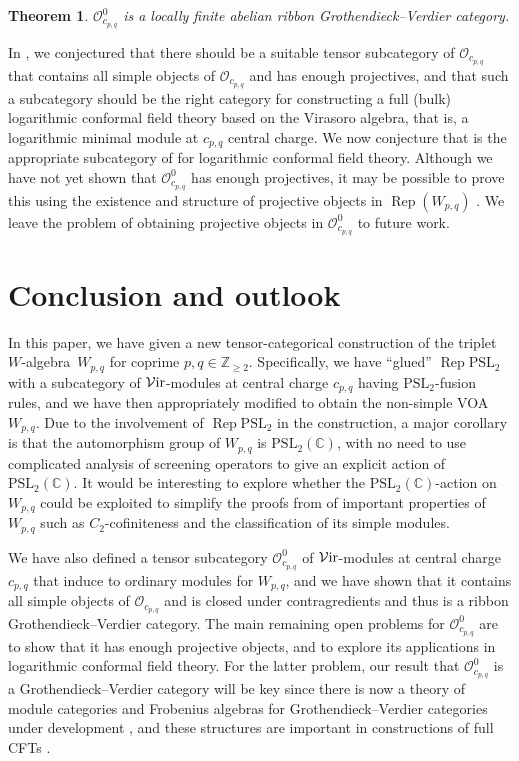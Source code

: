 \documentclass[pdftex]{sigma}
\numberwithin{equation}{section}
\newtheorem{Theorem}{Theorem}[section]
\theoremstyle{definition}
\begin{document}
\begin{Theorem}
$\mathcal{O}_{c_{p,q}}^0$ is a locally finite abelian ribbon Grothendieck--Verdier category.
\end{Theorem}

In \cite[Section 7]{MS-cpq-Vir}, we conjectured that there should be a suitable tensor subcategory of $\mathcal{O}_{c_{p,q}}$ that contains all simple objects of $\mathcal{O}_{c_{p,q}}$ and has enough projectives, and that such a subcategory should be the right category for constructing a full (bulk) logarithmic conformal field theory based on the Virasoro algebra, that is, a logarithmic minimal module at $c_{p,q}$ central charge. We now conjecture that  is the appropriate subcategory of  for logarithmic conformal field theory. Although we have not yet shown that $\mathcal{O}_{c_{p,q}}^0$ has enough projectives, it may be possible to prove this using the existence and structure of projective objects in $\operatorname{Rep}(W_{p,q})$ \cite{Nak-Wpq-projective}. We leave the problem of obtaining projective objects in $\mathcal{O}_{c_{p,q}}^0$ to future work.

\section{Conclusion and outlook}

In this paper, we have given a new tensor-categorical construction of the triplet $W$-algebra~$W_{p,q}$ for coprime $p,q\in\mathbb{Z}_{\geq 2}$. Specifically, we have ``glued'' $\operatorname{Rep} \mathrm{PSL}_2$ with a subcategory of $\mathcal{V}{\rm ir}$-modules at central charge $c_{p,q}$ having $\mathrm{PSL}_2$-fusion rules, and we have then appropriately modified to obtain the non-simple VOA $W_{p,q}$. Due to the involvement of $\operatorname{Rep} \mathrm{PSL}_2$ in the construction, a major corollary is that the automorphism group of $W_{p,q}$ is $\mathrm{PSL}_2(\mathbb{C})$, with no need to use complicated analysis of screening operators to give an explicit action of $\mathrm{PSL}_2(\mathbb{C})$. It would be interesting to explore whether the $\mathrm{PSL}_2(\mathbb{C})$-action on $W_{p,q}$ could be exploited to simplify the proofs from \cite{TW2} of important properties of $W_{p,q}$ such as $C_2$-cofiniteness and the classification of its simple modules.


We have also defined a tensor subcategory $\mathcal{O}_{c_{p,q}}^0$ of $\mathcal{V}{\rm ir}$-modules at central charge $c_{p,q}$ that induce to ordinary modules for $W_{p,q}$, and we have shown that it contains all simple objects of $\mathcal{O}_{c_{p,q}}$ and is closed under contragredients and thus is a ribbon Grothendieck--Verdier category. The main remaining open problems for $\mathcal{O}_{c_{p,q}}^0$ are to show that it has enough projective objects, and to explore its applications in logarithmic conformal field theory. For the latter problem, our result that $\mathcal{O}_{c_{p,q}}^0$ is a Grothendieck--Verdier category will be key since there is now a theory of module categories and Frobenius algebras for Grothendieck--Verdier categories under development \cite{FSSW}, and these structures are important in constructions of full CFTs \cite{RFFS, RGW}.
\end{document}
